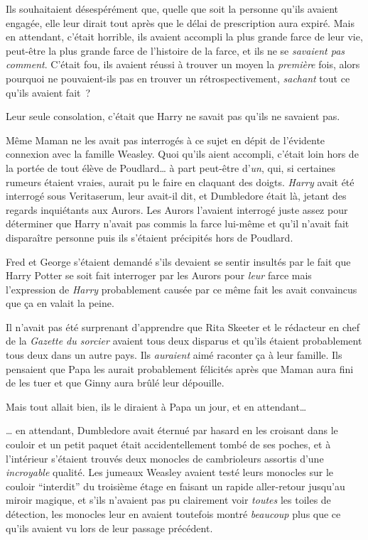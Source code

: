 Ils souhaitaient désespérément que, quelle que soit la personne qu'ils avaient engagée, elle leur dirait tout après que le délai de prescription aura expiré.
Mais en attendant, c'était horrible, ils avaient accompli la plus grande farce de leur vie, peut-être la plus grande farce de l'histoire de la farce, et ils ne se \emph{savaient pas comment}.
C'était fou, ils avaient réussi à trouver un moyen la \emph{première} fois, alors pourquoi ne pouvaient-ils pas en trouver un rétrospectivement, \emph{sachant} tout ce qu'ils avaient fait~?

Leur seule consolation, c'était que Harry ne savait pas qu'ils ne savaient pas.

Même Maman ne les avait pas interrogés à ce sujet en dépit de l'évidente connexion avec la famille Weasley.
Quoi qu'ils aient accompli, c'était loin hors de la portée de tout élève de Poudlard… à part peut-être d'\emph{un}, qui, si certaines rumeurs étaient vraies, aurait pu le faire en claquant des doigts.
\emph{Harry} avait été interrogé sous Veritaserum, leur avait-il dit, et Dumbledore était là, jetant des regards inquiétants aux Aurors.
Les Aurors l'avaient interrogé juste assez pour déterminer que Harry n'avait pas commis la farce lui-même et qu'il n'avait fait disparaître personne puis ils s'étaient précipités hors de Poudlard.

Fred et George s'étaient demandé s'ils devaient se sentir insultés par le fait que Harry Potter se soit fait interroger par les Aurors pour \emph{leur} farce mais l'expression de \emph{Harry} probablement causée par ce même fait les avait convaincus que ça en valait la peine.

Il n'avait pas été surprenant d'apprendre que Rita Skeeter et le rédacteur en chef de la \emph{Gazette du sorcier} avaient tous deux disparus et qu'ils étaient probablement tous deux dans un autre pays.
Ils \emph{auraient} aimé raconter ça à leur famille.
Ils pensaient que Papa les aurait probablement félicités après que Maman aura fini de les tuer et que Ginny aura brûlé leur dépouille.

Mais tout allait bien, ils le diraient à Papa un jour, et en attendant…

… en attendant, Dumbledore avait éternué par hasard en les croisant dans le couloir et un petit paquet était accidentellement tombé de ses poches, et à l'intérieur s'étaient trouvés deux monocles de cambrioleurs assortis d'une \emph{incroyable} qualité.
Les jumeaux Weasley avaient testé leurs monocles sur le couloir “interdit” du troisième étage en faisant un rapide aller-retour jusqu'au miroir magique, et s'ils n'avaient pas pu clairement voir \emph{toutes} les toiles de détection, les monocles leur en avaient toutefois montré \emph{beaucoup} plus que ce qu'ils avaient vu lors de leur passage précédent.

